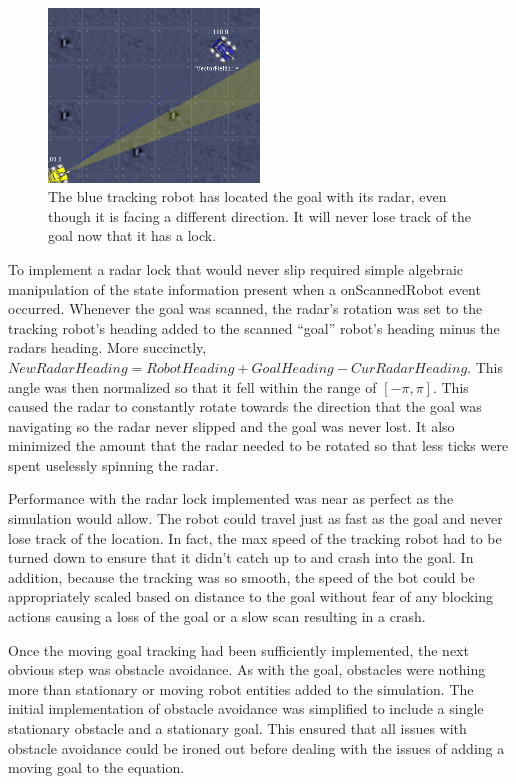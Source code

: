 \documentclass{aiaa-tc}%
\begin{document}
\begin{figure}[htb]
\centering
\includegraphics[width=0.5\textwidth]{images/RadarLock}
\caption{The blue tracking robot has located the goal with its radar, even though it is facing a different direction. It will never lose track of the goal now that it has a lock.}
\label{Radar Lock Example}
\end{figure}

To implement a radar lock that would never slip required simple algebraic manipulation of the state information present when a onScannedRobot event occurred. Whenever the goal was scanned, the radar's rotation was set to the tracking robot's heading added to the scanned ``goal'' robot's heading minus the radars heading. More succinctly, $NewRadarHeading = RobotHeading + GoalHeading - CurRadarHeading$. This angle was then normalized so that it fell within the range of $[-\pi, \pi]$. This caused the radar to constantly rotate towards the direction that the goal was navigating so the radar never slipped and the goal was never lost. It also minimized the amount that the radar needed to be rotated so that less ticks were spent uselessly spinning the radar.

Performance with the radar lock implemented was near as perfect as the simulation would allow. The robot could travel just as fast as the goal and never lose track of the location. In fact, the max speed of the tracking robot had to be turned down to ensure that it didn't catch up to and crash into the goal. In addition, because the tracking was so smooth, the speed of the bot could be appropriately scaled based on distance to the goal without fear of any blocking actions causing a loss of the goal or a slow scan resulting in a crash.

Once the moving goal tracking had been sufficiently implemented, the next obvious step was obstacle avoidance. As with the goal, obstacles were nothing more than stationary or moving robot entities added to the simulation. The initial implementation of obstacle avoidance was simplified to include a single stationary obstacle and a stationary goal. This ensured that all issues with obstacle avoidance could be ironed out before dealing with the issues of adding a moving goal to the equation. 
\end{document}
